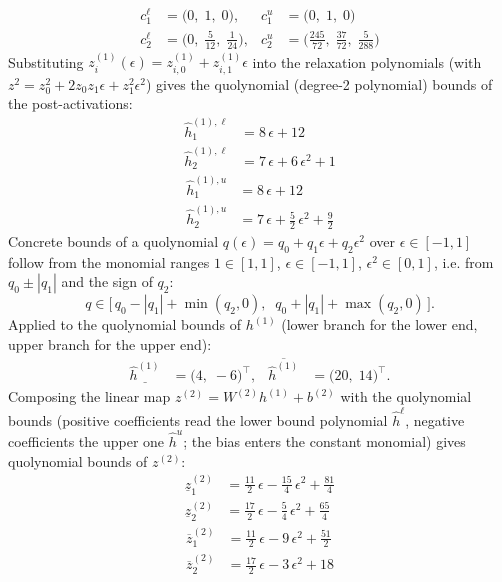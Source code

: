 \documentclass[11pt]{article}
\begin{document}
\begin{align*}
c^{\ell}_{1} &= \bigl(0,\; 1,\; 0\bigr), & c^{u}_{1} &= \bigl(0,\; 1,\; 0\bigr) \\
c^{\ell}_{2} &= \bigl(0,\; \frac{5}{12},\; \frac{1}{24}\bigr), & c^{u}_{2} &= \bigl(\frac{245}{72},\; \frac{37}{72},\; \frac{5}{288}\bigr)
\end{align*}
Substituting $z^{(1)}_i(\epsilon) = z^{(1)}_{i,0} + z^{(1)}_{i,1} \epsilon$ into the relaxation
polynomials (with $z^2 = z_0^2 + 2 z_0 z_1 \epsilon + z_1^2 \epsilon^2$) gives the quolynomial
(degree-2 polynomial) bounds of the post-activations:
\begin{align*}
\hat{h}^{(1),\ell}_{1} &= 8\,\epsilon + 12 \\
\hat{h}^{(1),\ell}_{2} &= 7\,\epsilon + 6\,\epsilon^2 + 1
\end{align*}
\begin{align*}
\hat{h}^{(1),u}_{1} &= 8\,\epsilon + 12 \\
\hat{h}^{(1),u}_{2} &= 7\,\epsilon + \frac{5}{2}\,\epsilon^2 + \frac{9}{2}
\end{align*}
Concrete bounds of a quolynomial $q(\epsilon) = q_0 + q_1 \epsilon + q_2 \epsilon^2$ over
$\epsilon \in [-1, 1]$ follow from the monomial ranges $1 \in [1, 1]$, $\epsilon \in [-1, 1]$,
$\epsilon^2 \in [0, 1]$, i.e. from $q_0 \pm |q_1|$ and the sign of $q_2$:
\begin{equation*}
q \in \bigl[\, q_0 - |q_1| + \min(q_2, 0), \;\; q_0 + |q_1| + \max(q_2, 0) \,\bigr].
\end{equation*}
Applied to the quolynomial bounds of $h^{(1)}$ (lower branch for the lower end, upper branch for the upper end):
\begin{align*}
\underline{\hat{h}^{(1)}} &= \bigl(4,\; -6\bigr)^{\!\top}, & \overline{\hat{h}^{(1)}} &= \bigl(20,\; 14\bigr)^{\!\top}.
\end{align*}
Composing the linear map $z^{(2)} = W^{(2)} h^{(1)} + b^{(2)}$ with the quolynomial bounds
(positive coefficients read the lower bound polynomial $\hat{h}^{\ell}$, negative coefficients the
upper one $\hat{h}^{u}$; the bias enters the constant monomial) gives quolynomial bounds of
$z^{(2)}$:
\begin{align*}
\underline{z}^{(2)}_{1} &= \frac{11}{2}\,\epsilon - \frac{15}{4}\,\epsilon^2 + \frac{81}{4} \\
\underline{z}^{(2)}_{2} &= \frac{17}{2}\,\epsilon - \frac{5}{4}\,\epsilon^2 + \frac{65}{4}
\end{align*}
\begin{align*}
\overline{z}^{(2)}_{1} &= \frac{11}{2}\,\epsilon - 9\,\epsilon^2 + \frac{51}{2} \\
\overline{z}^{(2)}_{2} &= \frac{17}{2}\,\epsilon - 3\,\epsilon^2 + 18
\end{align*}
\end{document}
